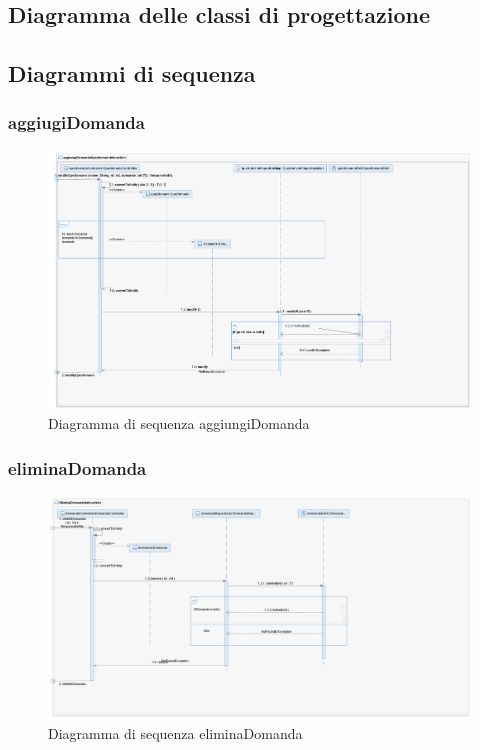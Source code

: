\documentclass[12pt]{article}
\begin{document}
\subsection{Diagramma delle classi di progettazione}
\subsection{Diagrammi di sequenza}
\subsubsection{aggiugiDomanda}
\begin{figure}[H]
\centering
\includegraphics[scale=0.40]{UNIMIBModule_aggiungiDomandaQuestionarioSequenceDiagram.png}
\caption{Diagramma di sequenza aggiungiDomanda}
\end{figure}
\subsubsection{eliminaDomanda}
\begin{figure}[H]
\centering
\includegraphics[scale=0.40]{UNIMIBModule_EliminaDomandaSequenceDiagram.png}
\caption{Diagramma di sequenza eliminaDomanda}
\end{figure}
\end{document}
